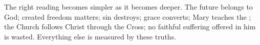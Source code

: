 The right reading becomes simpler as it becomes deeper. The future belongs to God; created freedom matters; sin destroys; grace converts; Mary teaches the ; the Church follows Christ through the Cross; no faithful suffering offered in him is wasted. Everything else is measured by these truths.
